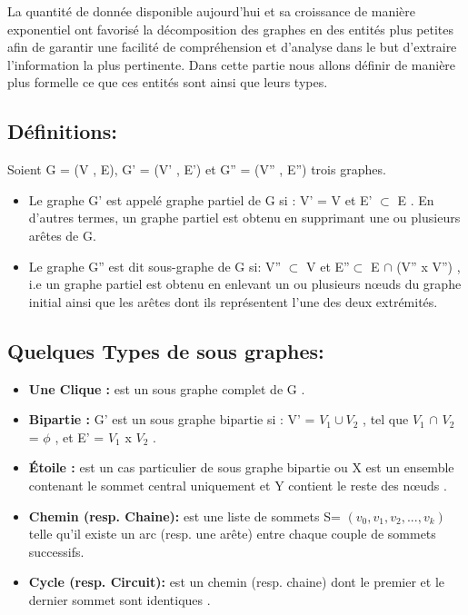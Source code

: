 
	La quantité de donnée disponible aujourd'hui et sa croissance de manière exponentiel ont favorisé la décomposition des graphes en des entités plus petites afin de garantir une facilité de compréhension et d'analyse dans le but d'extraire l'information la plus pertinente. Dans cette partie nous allons définir de manière plus formelle ce que ces entités sont ainsi que leurs types.
	
		
		
		
		\subsection{Définitions:}
		Soient G = (V , E), G' = (V' , E') et G'' = (V'' , E'') trois graphes.
		\begin{itemize}[label=$\circ$]
		
			\item Le graphe G' est appelé graphe partiel de G si : V' = V et E' $\subset$ E \citep{DUT}. En d'autres termes, un graphe partiel est obtenu en supprimant une ou plusieurs arêtes de G.
				

			\item Le graphe G'' est dit sous-graphe de G si: V'' $\subset$ V et 
			 E''$\subset$ E $\cap$ (V'' x V'') \citep{bac}, i.e un graphe partiel est obtenu en enlevant un ou plusieurs nœuds du graphe initial ainsi que les arêtes dont ils représentent l'une des deux extrémités.
			 
		\end{itemize}
		
		\subsection{Quelques Types de sous graphes:}
		
		\begin{itemize} [label = $\bullet$]
		
		
			\item \textbf{Une Clique :} est un sous graphe complet de G \citep{bac}.
			
			\item \textbf{Bipartie :} G' est un sous graphe bipartie si : V' = $V_{1} \cup V_{2}$ , tel que $V_{1}$ $\cap$ $V_{2}$ = $\phi$ , et E' = $V_{1}$ x $V_{2}$ \citep{bac}.
			
			\item \textbf{Étoile :}
			 est un cas particulier de sous graphe bipartie ou X est un ensemble contenant le sommet central uniquement et Y contient le reste des nœuds \citep{koutra2015summarizing} .
			 
			 \item \textbf{Chemin (resp. Chaine):}
			est une liste de sommets S= $(v_{0},v_{1},v_{2},...,v_{k})$ telle qu’il existe un arc (resp. une arête) entre chaque couple de sommets successifs.
			 
			 
			  \item \textbf{Cycle (resp. Circuit):} 
			 est un chemin (resp. chaine) dont le premier et le dernier sommet sont identiques \citep{DUT}.
			 
		\end{itemize}